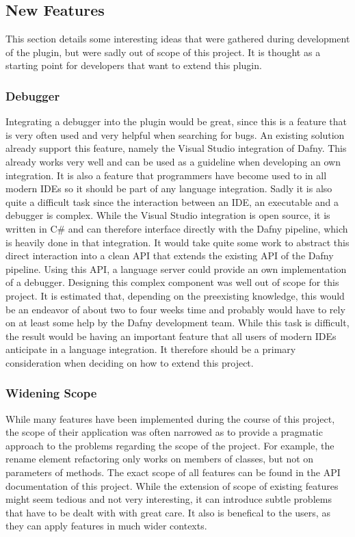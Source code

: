 \subsection{New Features} \label{featureExtensions}
This section details some interesting ideas that were gathered during development of the plugin, but were sadly out of scope of this project. It is thought as a starting point for developers that want to extend this plugin. 
\subsubsection{Debugger}
Integrating a debugger into the plugin would be great, since this is a feature that is very often used and very helpful when searching for bugs. An existing solution already support this feature, namely the Visual Studio integration \cite{visualstudiodafny} of Dafny. This already works very well and can be used as a guideline when developing an own integration. It is also a feature that programmers have become used to in all modern IDEs so it should be part of any language integration. \newline
Sadly it is also quite a difficult task since the interaction between an IDE, an executable and a debugger is complex. While the Visual Studio integration is open source, it is written in C\# and can therefore interface directly with the Dafny pipeline, which is heavily done in that integration. It would take quite some work to abstract this direct interaction into a clean API that extends the existing API of the Dafny pipeline. Using this API, a language server could provide an own implementation of a debugger.\newline
Designing this complex component was well out of scope for this project. It is estimated that, depending on the preexisting knowledge, this would be an endeavor of about two to four weeks time and probably would have to rely on at least some help by the Dafny development team. While this task is difficult, the result would be having an important feature that all users of modern IDEs anticipate in a language integration. It therefore should be a primary consideration when deciding on how to extend this project. 
\subsubsection{Widening Scope}
While many features have been implemented during the course of this project, the scope of their application was often narrowed as to provide a pragmatic approach to the problems regarding the scope of the project. For example, the rename element refactoring only works on members of classes, but not on parameters of methods. \newline
The exact scope of all features can be found in the API documentation of this project. While the extension of scope of existing features might seem tedious and not very interesting, it can introduce subtle problems that have to be dealt with with great care. It also is benefical to the users, as they can apply features in much wider contexts. 
